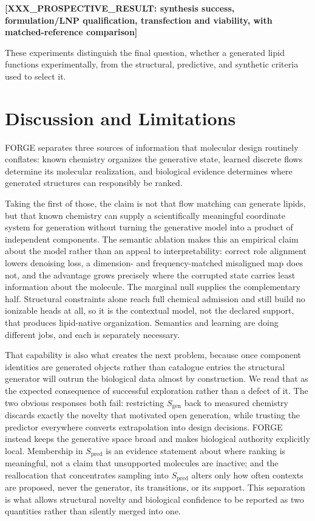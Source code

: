 \documentclass{article}
\newcommand{\PENDING}[1]{\textbf{[#1]}}
\newcommand{\ProspResultFull}{\PENDING{XXX\_PROSPECTIVE\_RESULT: synthesis success,
formulation/LNP qualification, transfection and viability, with matched-reference comparison}}
\newcommand{\Sgen}{\ensuremath{S_{\mathrm{gen}}}}
\newcommand{\Spred}{\ensuremath{S_{\mathrm{pred}}}}
\begin{document}
\ProspResultFull{}

These experiments distinguish the final question, whether a generated lipid functions experimentally,
from the structural, predictive, and synthetic criteria used to select it.

\section{Discussion and Limitations}
FORGE separates three sources of information that molecular design routinely conflates: known
chemistry organizes the generative state, learned discrete flows determine its molecular realization,
and biological evidence determines where generated structures can responsibly be ranked.

Taking the first of those, the claim is not that flow matching can generate lipids, but that known
chemistry can supply a scientifically meaningful coordinate system for generation without turning the
generative model into a product of independent components. The semantic ablation makes this an empirical claim about the model
rather than an appeal to interpretability: correct role alignment lowers denoising loss, a dimension-
and frequency-matched misaligned map does not, and the advantage grows precisely where the corrupted
state carries least information about the molecule. The marginal null supplies the complementary half.
Structural constraints alone reach full chemical admission and still build no ionizable heads at all,
so it is the contextual model, not the declared support, that produces lipid-native organization.
Semantics and learning are doing different jobs, and each is separately necessary.

That capability is also what creates the next problem, because once component identities are
generated objects rather than catalogue entries the structural generator will outrun the biological
data almost by construction. We read that as the expected
consequence of successful exploration rather than a defect of it. The two obvious responses both fail:
restricting \Sgen{} back to measured chemistry discards exactly the novelty that motivated open
generation, while trusting the predictor everywhere converts extrapolation into design decisions.
FORGE instead keeps the generative space broad and makes biological authority explicitly local.
Membership in \Spred{} is an evidence statement about where ranking is meaningful, not a claim that
unsupported molecules are inactive; and the reallocation that concentrates sampling into \Spred{}
alters only how often contexts are proposed, never the generator, its transitions, or its support.
This separation is what allows structural novelty and biological confidence to be reported as two
quantities rather than silently merged into one.
\end{document}
